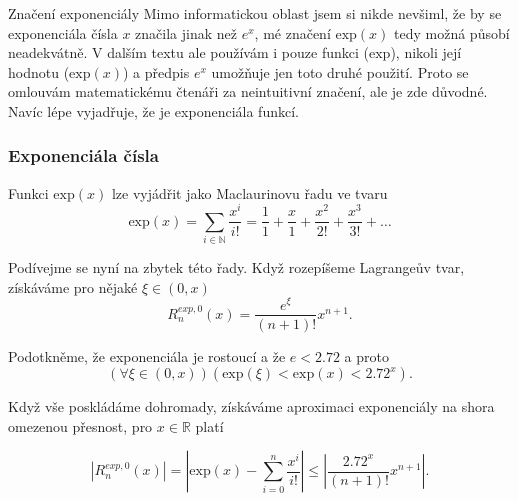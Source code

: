 \begin{myremark}{Značení exponenciály}
Mimo informatickou oblast jsem si nikde nevšiml, že by se exponenciála čísla $x$ značila jinak než $e^x$, mé značení $\mathrm{exp}(x)$ tedy možná působí neadekvátně. V dalším textu ale používám i pouze funkci ($\mathrm{exp}$), nikoli její hodnotu ($\mathrm{exp}(x)$) a předpis $e^x$ umožňuje jen toto druhé použití. Proto se omlouvám matematickému čtenáři za neintuitivní značení, ale je zde důvodné. Navíc lépe vyjadřuje, že je exponenciála funkcí.
\end{myremark}

\subsubsection{Exponenciála čísla}

\begin{fact}\label{vet:exp_jako_rada}
Funkci $\mathrm{exp}(x)$ lze vyjádřit jako Maclaurinovu řadu ve tvaru
\begin{equation}
\mathrm{exp}(x) = \underset{i \in \mathbb{N}}{\sum} \frac{x^i}{i!} = \frac{1}{1} + \frac{x}{1} + \frac{x^2}{2!} + \frac{x^3}{3!} + \ldots
\end{equation}
\end{fact}

Podívejme se nyní na zbytek této řady. Když rozepíšeme Lagrangeův tvar, získáváme pro nějaké $\xi\in(0,x)$
\begin{equation}
R_n^{exp, 0}(x) = \frac{e^\xi}{(n+1)!}x^{n+1}.
\end{equation}

Podotkněme, že exponenciála je rostoucí a že $e<2.72$ a proto
\begin{equation}
(\forall\xi\in (0,x))(\mathrm{exp}(\xi)<\mathrm{exp}(x) < 2.72^x).
\end{equation}

Když vše poskládáme dohromady, získáváme aproximaci exponenciály na shora omezenou přesnost, pro $x\in\mathbb{R}$ platí
\begin{fact}
\begin{equation}
|R_n^{exp, 0}(x)| = \left|\mathrm{exp}(x)- \sum_{i=0}^n \frac{x^i}{i!}\right| \leq \left| \frac{2.72^x}{(n+1)!}x^{n+1} \right|.
\end{equation}
\end{fact}

